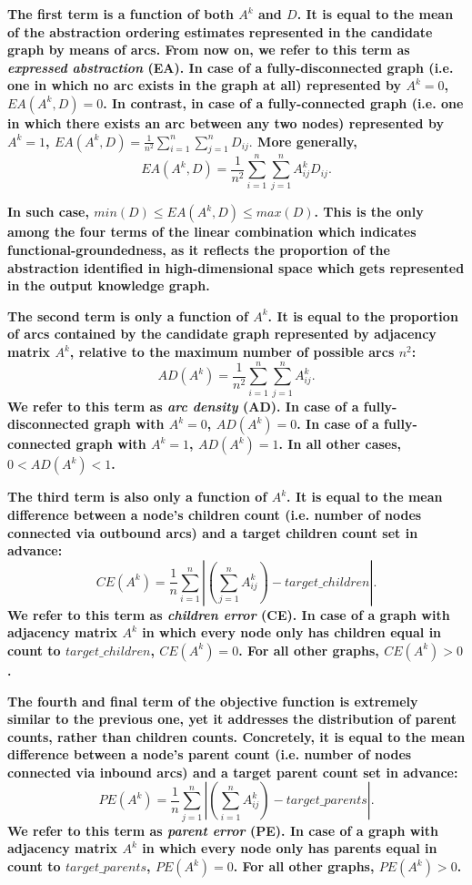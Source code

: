 \textbf{The first term is a function of both $A^k$ and $D$. It is equal to the mean of the abstraction ordering estimates represented in the candidate graph by means of arcs. From now on, we refer to this term as \textit{expressed abstraction} (EA). In case of a fully-disconnected graph (i.e. one in which no arc exists in the graph at all) represented by $A^k = 0$, $EA(A^k, D) = 0$. In contrast, in case of a fully-connected graph (i.e. one in which there exists an arc between any two nodes) represented by $A^k = 1$, $EA(A^k, D) = \frac{1}{n^2} \sum_{i=1}^{n} \sum_{j=1}^{n} D_{ij}.$ More generally, $$EA(A^k, D) = \frac{1}{n^2} \sum_{i=1}^{n} \sum_{j=1}^{n} A^k_{ij}D_{ij}.$$}

\textbf{In such case, $min(D) \leq EA(A^k, D) \leq max(D)$. This is the only among the four terms of the linear combination which indicates functional-groundedness, as it reflects the proportion of the abstraction identified in high-dimensional space which gets represented in the output knowledge graph.}

\textbf{The second term is only a function of $A^k$. It is equal to the proportion of arcs contained by the candidate graph represented by adjacency matrix $A^k$, relative to the maximum number of possible arcs $n^2$: $$AD(A^k) = \frac{1}{n^2} \sum_{i=1}^{n} \sum_{j=1}^{n} A^k_{ij}.$$ We refer to this term as \textit{arc density} (AD). In case of a fully-disconnected graph with $A^k = 0$, $AD(A^k) = 0$. In case of a fully-connected graph with $A^k = 1$, $AD(A^k) = 1$. In all other cases, $0 < AD(A^k) < 1$.}

\textbf{The third term is also only a function of $A^k$. It is equal to the mean difference between a node's children count (i.e. number of nodes connected via outbound arcs) and a target children count set in advance: $$CE(A^k) = \frac{1}{n} \sum_{i=1}^{n} \left|(\sum_{j=1}^{n}A^k_{ij}) - target\_children\right|.$$ We refer to this term as \textit{children error} (CE). In case of a graph with adjacency matrix $A^k$ in which every node only has children equal in count to $target\_children$, $CE(A^k)=0$. For all other graphs, $CE(A^k) > 0$.}

\textbf{The fourth and final term of the objective function is extremely similar to the previous one, yet it addresses the distribution of parent counts, rather than children counts. Concretely, it is equal to the mean difference between a node's parent count (i.e. number of nodes connected via inbound arcs) and a target parent count set in advance: $$PE(A^k) = \frac{1}{n} \sum_{j=1}^{n} \left|(\sum_{i=1}^{n}A^k_{ij}) - target\_parents\right|.$$ We refer to this term as \textit{parent error} (PE). In case of a graph with adjacency matrix $A^k$ in which every node only has parents equal in count to $target\_parents$, $PE(A^k)=0$. For all other graphs, $PE(A^k) > 0$.}

